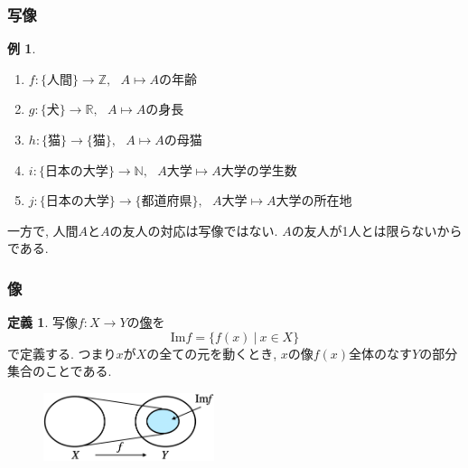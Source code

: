 \documentclass[dvipdfmx,cjk,10.2pt]{beamer}
\newcommand{\R}{\mathbb{R}}
\newcommand{\Z}{\mathbb{Z}}
\newcommand{\N}{\mathbb{N}}
\newcommand{\Imag}{\mathrm{Im}}
\theoremstyle{definition}
\newtheorem{Ex}[Thm]{例}
\newtheorem{Def}[Thm]{定義}
\begin{document}
\begin{frame}
\frametitle{写像}


\begin{Ex}
\begin{enumerate}
\item $f:\{\text{人間}\} \longrightarrow \Z, \ \ \ A \mapsto \text{$A$の年齢}$
\item $g:\{\text{犬}\} \longrightarrow \R, \ \ \ A \mapsto \text{$A$の身長}$
\item $h:\{\text{猫}\} \longrightarrow \{\text{猫}\}, \ \ \ A \mapsto \text{$A$の母猫}$
\item $i:\{\text{日本の大学}\} \longrightarrow \N, \ \ \ \text{$A$大学} \mapsto \text{$A$大学の学生数}$
\item $j:\{\text{日本の大学}\} \longrightarrow \{\text{都道府県}\}, \ \ \ \text{$A$大学} \mapsto \text{$A$大学の所在地}$
\end{enumerate}
一方で, 人間$A$と$A$の友人の対応は写像ではない. 
$A$の友人が1人とは限らないからである. 
\end{Ex}


\end{frame}





\begin{frame}
\frametitle{像}


\begin{Def}
写像$f:X\rightarrow Y$の\underline{像}を
$$
\Imag f = \{ f(x) \ | \ x \in X\}
$$
で定義する. 
つまり$x$が$X$の全ての元を動くとき, $x$の像$f(x)$全体のなす$Y$の部分集合のことである. 
\end{Def}


 \begin{figure}[htbp]
 \begin{center} 
  \includegraphics[width=50mm]{imf.png}
 \end{center}
\end{figure}


\end{frame}

\end{document}
